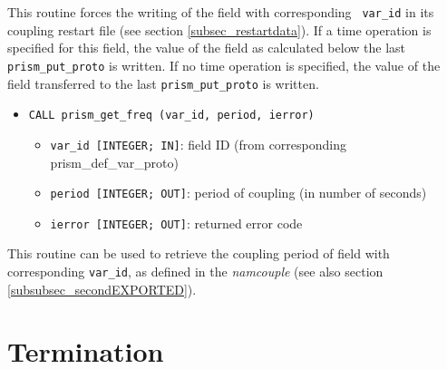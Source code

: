 This routine forces the writing of the field with corresponding {\tt
var\_id} in its coupling restart file (see section
\ref{subsec_restartdata}). If a time operation is specified for this
field, the value of the field as calculated below the last {\tt
prism\_put\_proto} is written. If no time operation is specified, the
value of the field transferred to the last {\tt prism\_put\_proto} is
written.


\begin{itemize} 
\item {\tt CALL prism\_get\_freq (var\_id, period, ierror)}
\begin{itemize}
\item {\tt var\_id [INTEGER; IN]}: field ID (from
  corresponding prism\_def\_var\_proto)
\item {\tt period [INTEGER; OUT]}: period of coupling (in number of seconds)
\item {\tt ierror [INTEGER; OUT]}: returned error code
\end{itemize}
\end{itemize}
This routine can be used to retrieve the coupling period of field with
corresponding {\tt var\_id}, as defined in the {\it namcouple} (see
also section \ref{subsubsec_secondEXPORTED}).

\section{Termination}
\label{subsubsec_Termination}

